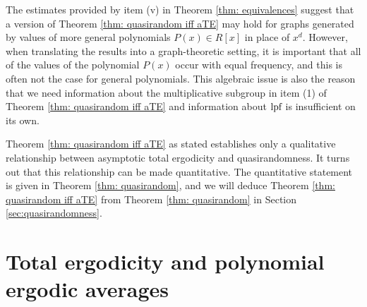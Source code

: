 \documentclass{amsart}
\theoremstyle{definition}
\numberwithin{equation}{section}
\newcommand{\lpf}{\normalfont\text{lpf}}
\begin{document}
The estimates provided by item (v) in Theorem \ref{thm: equivalences} suggest that a version of Theorem \ref{thm: quasirandom iff aTE} may hold for graphs generated by values of more general polynomials $P(x) \in R[x]$ in place of $x^d$.
However, when translating the results into a graph-theoretic setting, it is important that all of the values of the polynomial $P(x)$ occur with equal frequency, and this is often not the case for general polynomials.
This algebraic issue is also the reason that we need information about the multiplicative subgroup in item (1) of Theorem \ref{thm: quasirandom iff aTE} and information about $\lpf$ is insufficient on its own.

Theorem \ref{thm: quasirandom iff aTE} as stated establishes only a qualitative relationship between asymptotic total ergodicity and quasirandomness.
It turns out that this relationship can be made quantitative.
The quantitative statement is given in Theorem \ref{thm: quasirandom}, and we will deduce Theorem \ref{thm: quasirandom iff aTE} from Theorem \ref{thm: quasirandom} in Section \ref{sec:quasirandomness}.


\section{Total ergodicity and polynomial ergodic averages} \label{sec:TE polynomial}
\end{document}
